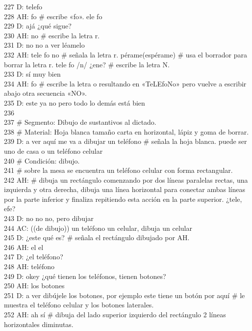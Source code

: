227 D: telefo\\
228 AH: fo \# escribe «fo». ele fo\\
229 D: ajá ¿qué sigue?\\
230 AH: no \# escribe la letra r.\\
231 D: no no a ver léamelo\\
232 AH: tele fo no \# señala la letra r. pérame(espérame) \# usa el borrador para borrar la letra r. tele fo /n/ ¿ene? \# escribe la letra N.\\
233 D: sí muy bien\\
234 AH: fo \# escribe la letra o resultando en «TeLEfoNo» pero vuelve a escribir abajo otra secuencia «NO».\\
235 D: este ya no pero todo lo demás está bien\\
236 \\
237 \# Segmento: Dibujo de sustantivos al dictado.\\
238 \# Material: Hoja blanca tamaño carta en horizontal, lápiz y goma de borrar.\\
239 D: a ver aquí me va a dibujar un teléfono \# señala la hoja blanca. puede ser uno de casa o un teléfono celular\\
240 \# Condición: dibujo.\\
241 \# sobre la mesa se encuentra un teléfono celular con forma rectangular.\\
242 AH: \# dibuja un rectángulo comenzando por dos líneas paralelas rectas, una izquierda y otra derecha, dibuja una línea horizontal para conectar ambas líneas por la parte inferior y finaliza repitiendo esta acción en la parte superior. ¿tele, efe?\\
243 D: no no no, pero dibujar\\
244 AC: ((de dibujo)) un teléfono un celular, dibuja un celular\\
245 D: ¿este qué es? \# señala el rectángulo dibujado por AH.\\
246 AH: el el\\
247 D: ¿el teléfono?\\
248 AH: teléfono\\
249 D: okey ¿qué tienen los teléfonos, tienen botones?\\
250 AH: los botones\\
251 D: a ver dibújele los botones, por ejemplo este tiene un botón por aquí \# le muestra el teléfono celular y los botones laterales.\\
252 AH: ah sí \# dibuja del lado superior izquierdo del rectángulo 2 líneas horizontales diminutas.\\

